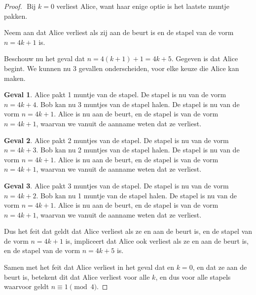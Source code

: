 \documentclass[12pt, dutch, a4paper]{article}
\theoremstyle{definition}
\newtheorem{case}{Geval}
\begin{document}
\begin{proof} $ $ \newline
  Bij $k = 0$ verliest Alice, want haar enige optie is het laatste muntje pakken.

  Neem aan dat Alice verliest als zij aan de beurt is en de stapel van de vorm $n = 4k + 1$ is.

  Beschouw nu het geval dat $n = 4(k + 1) + 1 = 4k + 5$.
  Gegeven is dat Alice begint. We kunnen nu 3 gevallen onderscheiden, 
  voor elke keuze die Alice kan maken.
  \begin{case}
    Alice pakt 1 muntje van de stapel. 
    De stapel is nu van de vorm $n = 4k + 4$. 
    Bob kan nu 3 muntjes van de stapel halen. De stapel is nu van de vorm $n = 4k + 1$. 
    Alice is nu aan de beurt, en de stapel is van de vorm $n = 4k + 1$, 
    waarvan we vanuit de aanname weten dat ze verliest. 
  \end{case}

  \begin{case}
    Alice pakt 2 muntjes van de stapel.
    De stapel is nu van de vorm $n = 4k + 3$. 
    Bob kan nu 2 muntjes van de stapel halen. De stapel is nu van de vorm $n = 4k + 1$.
    Alice is nu aan de beurt, en de stapel is van de vorm $n = 4k + 1$, 
    waarvan we vanuit de aanname weten dat ze verliest. 
  \end{case}

  \begin{case}
    Alice pakt 3 muntjes van de stapel.
    De stapel is nu van de vorm $n = 4k + 2$. 
    Bob kan nu 1 muntje van de stapel halen. De stapel is nu van de vorm $n = 4k + 1$.
    Alice is nu aan de beurt, en de stapel is van de vorm $n = 4k + 1$, 
    waarvan we vanuit de aanname weten dat ze verliest. 
  \end{case}

  Dus het feit dat geldt dat Alice verliest als ze 
  en aan de beurt is, en de stapel van de vorm $n = 4k + 1$ is,
  impliceert dat Alice ook verliest als ze 
  en aan de beurt is, en de stapel van de vorm $n = 4k + 5$ is.

  Samen met het feit dat Alice verliest in het geval dat en $k = 0$, 
  en dat ze aan de beurt is, betekent dit dat Alice verliest voor alle $k$, 
  en dus voor alle stapels waarvoor geldt $n \equiv 1 \pmod{4}$. 

\end{proof} 
\end{document}
